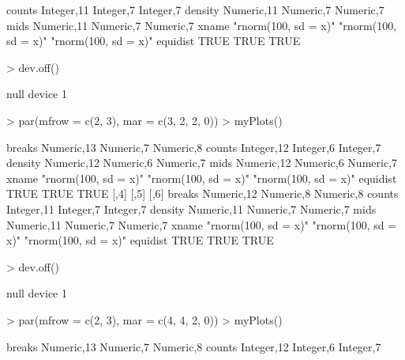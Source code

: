 \documentclass[12pt,letterpaper,final]{article}
\begin{document}
\begin{Schunk}
\begin{Soutput}
counts   Integer,11           Integer,7            Integer,7           
density  Numeric,11           Numeric,7            Numeric,7           
mids     Numeric,11           Numeric,7            Numeric,7           
xname    "rnorm(100, sd = x)" "rnorm(100, sd = x)" "rnorm(100, sd = x)"
equidist TRUE                 TRUE                 TRUE                
\end{Soutput}
\begin{Sinput}
> dev.off()
\end{Sinput}
\begin{Soutput}
null device 
          1 
\end{Soutput}
\begin{Sinput}
> par(mfrow = c(2, 3), mar = c(3, 2, 2, 0))
> myPlots()
\end{Sinput}
\begin{Soutput}
         [,1]                 [,2]                 [,3]                
breaks   Numeric,13           Numeric,7            Numeric,8           
counts   Integer,12           Integer,6            Integer,7           
density  Numeric,12           Numeric,6            Numeric,7           
mids     Numeric,12           Numeric,6            Numeric,7           
xname    "rnorm(100, sd = x)" "rnorm(100, sd = x)" "rnorm(100, sd = x)"
equidist TRUE                 TRUE                 TRUE                
         [,4]                 [,5]                 [,6]                
breaks   Numeric,12           Numeric,8            Numeric,8           
counts   Integer,11           Integer,7            Integer,7           
density  Numeric,11           Numeric,7            Numeric,7           
mids     Numeric,11           Numeric,7            Numeric,7           
xname    "rnorm(100, sd = x)" "rnorm(100, sd = x)" "rnorm(100, sd = x)"
equidist TRUE                 TRUE                 TRUE                
\end{Soutput}
\begin{Sinput}
> dev.off()
\end{Sinput}
\begin{Soutput}
null device 
          1 
\end{Soutput}
\begin{Sinput}
> par(mfrow = c(2, 3), mar = c(4, 4, 2, 0))
> myPlots()
\end{Sinput}
\begin{Soutput}
         [,1]                 [,2]                 [,3]                
breaks   Numeric,13           Numeric,7            Numeric,8           
counts   Integer,12           Integer,6            Integer,7           

\end{Soutput}
\end{Schunk}
\end{document}
